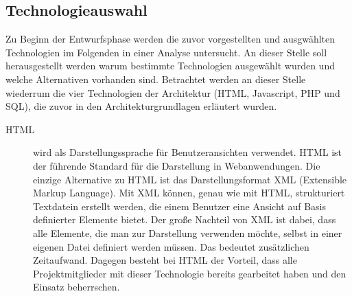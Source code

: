 \subsection{Technologieauswahl}
\label{sec:Technologieauswahl}

Zu Beginn der Entwurfsphase werden die zuvor vorgestellten und ausgwählten Technologien im Folgenden in einer Analyse untersucht. An dieser Stelle soll herausgestellt werden warum bestimmte Technologien ausgewählt wurden und welche Alternativen vorhanden sind. Betrachtet werden an dieser Stelle wiederrum die vier Technologien der Architektur (HTML, Javascript, PHP und SQL), die zuvor in den Architekturgrundlagen erläutert wurden.

\begin{description}
  \item[HTML] wird als Darstellungssprache für Benutzeransichten verwendet. HTML ist der führende Standard für die Darstellung in Webanwendungen. Die einzige Alternative zu HTML ist das Darstellungsformat XML (Extensible Markup Language). Mit XML können, genau wie mit HTML, strukturiert Textdatein erstellt werden, die einem Benutzer eine Ansicht auf Basis definierter Elemente bietet. Der große Nachteil von XML ist dabei, dass alle Elemente, die man zur Darstellung verwenden möchte, selbst in einer eigenen Datei definiert werden müssen. Das bedeutet zusätzlichen Zeitaufwand. Dagegen besteht bei HTML der Vorteil, dass alle Projektmitglieder mit dieser Technologie bereits gearbeitet haben und den Einsatz beherrschen.


\end{description}
